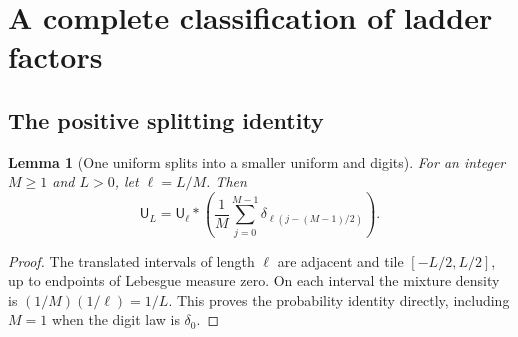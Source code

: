 \documentclass[11pt,a4paper]{article}
\newtheorem{lemma}[theorem]{Lemma}
\theoremstyle{definition}
\theoremstyle{remark}
\newcommand{\Unif}{\mathsf U}
\begin{document}
\section{A complete classification of ladder factors}
\label{sec:ladder}

\subsection{The positive splitting identity}
\begin{lemma}[One uniform splits into a smaller uniform and digits]
\label{lem:uniform-split}
For an integer $M\ge1$ and $L>0$, let $\ell=L/M$. Then
\begin{equation}\label{eq:uniform-split}
 \Unif_L=\Unif_\ell *
 \left(\frac1M\sum_{j=0}^{M-1}
 \delta_{\ell(j-(M-1)/2)}\right).
\end{equation}
\end{lemma}
\begin{proof}
The translated intervals of length $\ell$ are adjacent and tile
$[-L/2,L/2]$, up to endpoints of Lebesgue measure zero. On each interval
the mixture density is $(1/M)(1/\ell)=1/L$. This proves the probability
identity directly, including $M=1$ when the digit law is $\delta_0$.
\end{proof}
\end{document}
